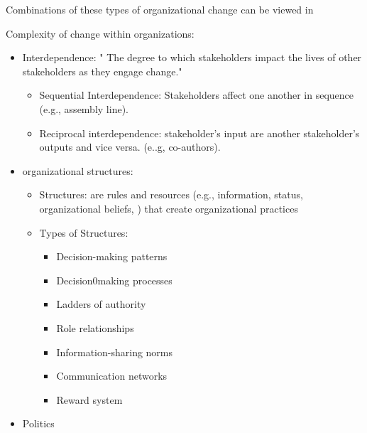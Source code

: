 \documentclass[
]{book}
\providecommand{\tightlist}{%
  \setlength{\itemsep}{0pt}\setlength{\parskip}{0pt}}
\begin{document}
Combinations of these types of organizational change can be viewed in \citep[pp.~42]{Lewis_2019}

Complexity of change within organizations:

\begin{itemize}
\item
  Interdependence: " The degree to which stakeholders impact the lives of other stakeholders as they engage change." \citep{Lewis_2019}

  \begin{itemize}
  \tightlist
  \item
    Sequential Interdependence: Stakeholders affect one another in sequence (e.g., assembly line).\\
  \item
    Reciprocal interdependence: stakeholder's input are another stakeholder's outputs and vice versa. (e..g, co-authors).\\
  \end{itemize}
\item
  organizational structures:

  \begin{itemize}
  \item
    Structures: are rules and resources (e.g., information, status, organizational beliefs, ) that create organizational practices\\
  \item
    Types of Structures:

    \begin{itemize}
    \tightlist
    \item
      Decision-making patterns\\
    \item
      Decision0making processes\\
    \item
      Ladders of authority\\
    \item
      Role relationships\\
    \item
      Information-sharing norms\\
    \item
      Communication networks\\
    \item
      Reward system\\
    \end{itemize}
  \end{itemize}
\item
  Politics
\end{itemize}
\end{document}
